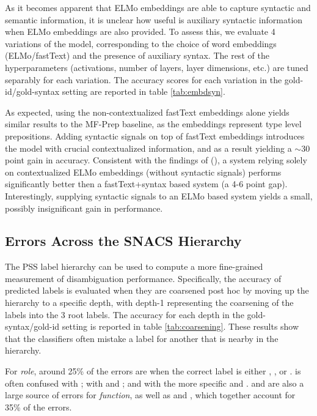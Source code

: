 As it becomes apparent that ELMo embeddings are able to capture syntactic and semantic information, it is unclear how useful is auxiliary syntactic information when ELMo embeddings are also provided. To assess this, we evaluate 4 variations of the model, corresponding to the choice of word embeddings (ELMo/fastText) and the presence of auxiliary syntax. The rest of the hyperparameters (activations, number of layers, layer dimensions, etc.) are tuned separably for each variation. The accuracy scores for each variation in the gold-id/gold-syntax setting are reported in table \ref{tab:embdsyn}.

As expected, using the non-contextualized fastText embeddings alone yields similar results to the MF-Prep baseline, as the embeddings represent type level prepositions. Adding syntactic signals on top of fastText embeddings introduces the model with crucial contextualized information, and as a result yielding a $\sim$30 point gain in accuracy. Consistent with the findings of (\cite{nelson}), a system relying solely on contextualized ELMo embeddings (without syntactic signals) performs significantly better then a fastText+syntax based system (a 4-6 point gap). Interestingly, supplying syntactic signals to an ELMo based system yields a small, possibly insignificant gain in performance. 

\subsection{Errors Across the SNACS Hierarchy}

The PSS label hierarchy can be used to compute a more fine-grained measurement of disambiguation performance.  Specifically, the accuracy of predicted labels is evaluated when they are coarsened post hoc by moving up the hierarchy to a specific depth, with depth-1 representing the coarsening of the labels into the 3 root labels. The accuracy for each depth in the gold-syntax/gold-id setting is reported in table \ref{tab:coarsening}. These
results show that the classifiers often mistake a label for another that is nearby in the hierarchy.

For \textit{role}, around 25\% of the errors are when the correct label is either , , or .   is often confused with  ;  with  and ; and  with the more specific  and . 
 and  are also a large source of errors for \textit{function}, as well as  and , which together account for 35\% of the errors.



